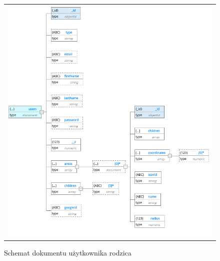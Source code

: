 \documentclass{sprawozdanie-agh}
\begin{document}
			\begin{figure}[H] 
				\centering 
				\begin{tabular}{c}
					\includegraphics[]{users.png} 
				\end{tabular} 
				\caption{Schemat dokumentu użytkownika rodzica}
			\end{figure}
\end{document}
